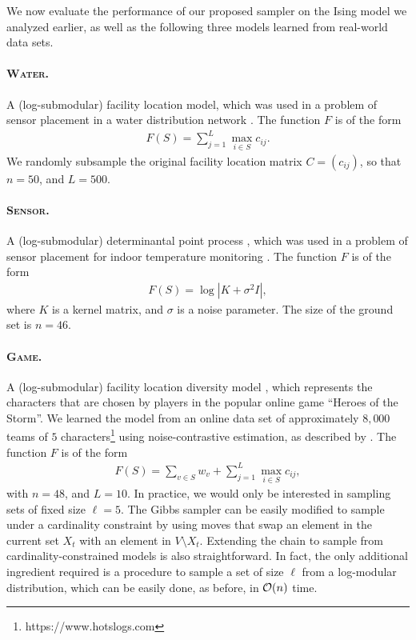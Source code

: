 We now evaluate the performance of our proposed sampler on the Ising model we analyzed earlier, as well as the following three models learned from real-world data sets.
\paragraph{\textsc{Water}.} A (log-submodular) facility location model, which was used in a problem of sensor placement in a water distribution network \citep{krause08}.
The function $F$ is of the form
\begin{align*}
F(S) = \sum_{j = 1}^L \max_{i \in S}c_{ij}.
\end{align*}
We randomly subsample the original facility location matrix $C = (c_{ij})$, so that $n = 50$, and $L = 500$.
\paragraph{\textsc{Sensor}.} A (log-submodular) determinantal point process \citep{kulesza12}, which was used in a problem of sensor placement for indoor temperature monitoring \citep{guestrin05}.
The function $F$ is of the form
\begin{align*}
F(S) = \log |K + \sigma^2 I|,
\end{align*}
where $K$ is a kernel matrix, and $\sigma$ is a noise parameter.
The size of the ground set is $n = 46$.
\paragraph{\textsc{Game}.} A (log-submodular) facility location diversity model \citep{tschiatschek16}, which represents the characters that are chosen by players in the popular online game ``Heroes of the Storm''.
We learned the model from an online data set of approximately $8,000$ teams of $5$ characters\footnote{https://www.hotslogs.com} using noise-contrastive estimation, as described by \cite{tschiatschek16}.
The function $F$ is of the form
\begin{align*}
F(S) = \sum_{v \in S}w_v + \sum_{j = 1}^L \max_{i \in S}c_{ij},
\end{align*}
with $n = 48$, and $L = 10$.
In practice, we would only be interested in sampling sets of fixed size $\ell = 5$.
The Gibbs sampler can be easily modified to sample under a cardinality constraint by using moves that swap an element in the current set $X_t$ with an element in $V \setminus X_t$.
Extending the \Ms{} chain to sample from cardinality-constrained models is also straightforward.
In fact, the only additional ingredient required is a procedure to sample a set of size $\ell$ from a log-modular distribution, which can be easily done, as before, in $\mathcal{O}(n)$ time.

